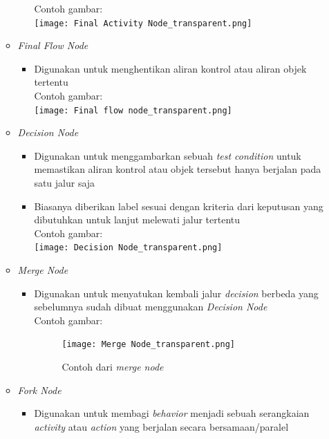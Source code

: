 \documentclass[a4paper]{article}
\begin{document}
\begin{enumerate}
\begin{itemize}
\begin{itemize}
                  Contoh gambar:\\
                  \texttt{[image: Final Activity Node\_transparent.png]}
        \end{itemize}
        \item \textit{Final Flow Node}
        \begin{itemize}
            \item Digunakan untuk menghentikan aliran kontrol atau aliran objek tertentu\autocite{systemanalysisdesign-activity-diagram}\\
                  Contoh gambar:\\
                  \texttt{[image: Final flow node\_transparent.png]}
        \end{itemize}
        \item \textit{Decision Node}
        \begin{itemize}
            \item Digunakan untuk menggambarkan sebuah \textit{test condition} untuk memastikan aliran kontrol atau objek tersebut hanya berjalan pada satu jalur saja
            \item Biasanya diberikan label sesuai dengan kriteria dari keputusan yang dibutuhkan untuk lanjut melewati jalur tertentu\autocite{systemanalysisdesign-activity-diagram}\\
                  Contoh gambar:\\
                  \texttt{[image: Decision Node\_transparent.png]}
        \end{itemize}
        \item \textit{Merge Node}
        \begin{itemize}
            \item Digunakan untuk menyatukan kembali jalur \textit{decision} berbeda yang sebelumnya sudah dibuat menggunakan \textit{Decision Node}\autocite{systemanalysisdesign-activity-diagram}\\
                  Contoh gambar:\\
                  \begin{figure}[h]
                  \centering
                  \texttt{[image: Merge Node\_transparent.png]}
                  \caption{Contoh dari \textit{merge node}}
                  \end{figure}
        \end{itemize}
        \item \textit{Fork Node}
        \begin{itemize}
            \item Digunakan untuk membagi \textit{behavior} menjadi sebuah serangkaian \textit{activity} atau \textit{action} yang berjalan secara bersamaan/paralel\autocite{systemanalysisdesign-activity-diagram}\\

\end{itemize}
\end{itemize}
\end{enumerate}
\end{document}

